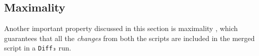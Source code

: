 \documentclass[../Thesis.tex]{subfiles}
\begin{document}
%
%	

	\subsection{Maximality}
	\label{subsec:Maximality}
	Another important property discussed in this section is maximality 
	\cite{Pierce07}, which guarantees that all the \emph{changes} from both
	the scripts are included in the merged script in a \texttt{Diff₃} run.
		
\end{document}
